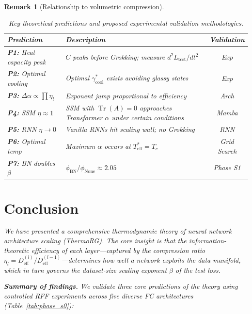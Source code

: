 \documentclass[11pt, a4paper]{article}
\theoremstyle{plain}
\newtheorem*{remark}{Remark}
\DeclareMathOperator{\Tr}{Tr}
\begin{document}
\begin{remark}[Relationship to volumetric compression]
\begin{table}[h]
\centering
\caption{Key theoretical predictions and proposed experimental validation methodologies.}
\vspace{0.2cm}
\begin{tabular}{lp{8cm}c}
\toprule
\textbf{Prediction} & \textbf{Description} & \textbf{Validation} \\
\midrule
\textbf{P1:} Heat capacity peak & $C$ peaks before Grokking; measure $d^2L_{\text{test}}/dt^2$ & Exp \\
\textbf{P2:} Optimal cooling & Optimal $\gamma_{\text{cool}}^*$ exists avoiding glassy states & Exp \\
\textbf{P3:} $\Delta\alpha\propto\prod\eta_l$ & Exponent jump proportional to efficiency & Arch \\
\textbf{P4:} SSM $\eta\approx1$ & SSM with $\Tr(A)=0$ approaches Transformer $\alpha$ under certain conditions & Mamba \\
\textbf{P5:} RNN $\eta\to0$ & Vanilla RNNs hit scaling wall; no Grokking & RNN \\
\textbf{P6:} Optimal temp & Maximum $\alpha$ occurs at $T_{\text{eff}}^* = T_c$ & Grid Search \\
\textbf{P7:} BN doubles $\beta$ & $\phi_{\mathrm{BN}}/\phi_{\mathrm{None}} \approx 2.05$ & Phase S1 \\
\bottomrule
\end{tabular}
\label{tab:predictions}
\end{table}

\section{Conclusion}
\label{sec:conclusion}

We have presented a comprehensive thermodynamic theory of neural network architecture scaling (ThermoRG). The core insight is that the information-theoretic efficiency of each layer---captured by the compression ratio $\eta_l = D_{\mathrm{eff}}^{(l)}/D_{\mathrm{eff}}^{(l-1)}$---determines how well a network exploits the data manifold, which in turn governs the dataset-size scaling exponent $\beta$ of the test loss.

\bigskip\noindent\textbf{Summary of findings.} We validate three core predictions of the theory using controlled RFF experiments across five diverse FC architectures (Table~\ref{tab:phase_s0}):


\end{remark}
\end{document}
